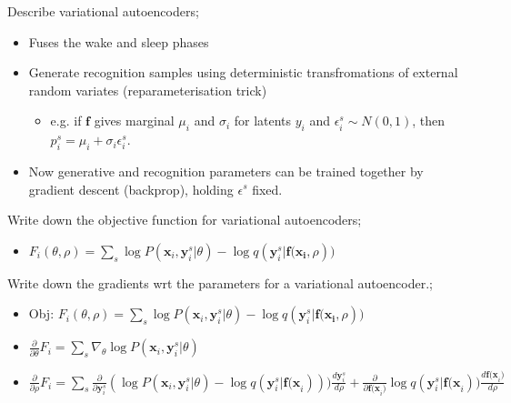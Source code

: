 \documentclass{article}
\begin{document}
Describe variational autoencoders; \begin{itemize}
    \item Fuses the wake and sleep phases
    \item Generate recognition samples using deterministic transfromations of external random variates (reparameterisation trick) \begin{itemize}
        \item e.g. if $\bm{f}$ gives marginal $\mu_i$ and $\sigma_i$ for latents $y_i$ and $\epsilon^s_i \sim N(0,1)$, then $p^s_i = \mu_i + \sigma_i\epsilon_i^s$.
    \end{itemize}
    \item Now generative and recognition parameters can be trained together by gradient descent (backprop), holding $\epsilon^s$ fixed.
\end{itemize}

Write down the objective function for variational autoencoders; \begin{itemize}
    \item $F_i(\theta, \rho) = \sum_s \log P(\bm{x}_i, \bm{y}_i^s|\theta) - \log q(\bm{y}_i^s|\bm{f(x_i}, \rho))$
\end{itemize}

Write down the gradients wrt the parameters for a variational autoencoder.;\begin{itemize}
    \item Obj: $F_i(\theta, \rho) = \sum_s \log P(\bm{x}_i, \bm{y}_i^s|\theta) - \log q(\bm{y}_i^s|\bm{f(x_i}, \rho))$
    \item $\frac{\partial}{\partial \theta}F_i = \sum_s \nabla_\theta \log P(\bm{x}_i, \bm{y}^s_i|\theta)$
    \item $\frac{\partial}{\partial\rho}F_i = \sum_s \frac{\partial}{\partial \bm{y}^s_i}(\log P(\bm{x}_i, \bm{y}_i^s|\theta) - \log q(\bm{y}^s_i|\bm{f(x}_i)))\frac{d\bm{y}^s_i}{d\rho} + \frac{\partial}{\partial \bm{f(x}_i)}\log q(\bm{y}_i^s|\bm{f(x}_i))\frac{d\bm{f(x}_i)}{d\rho}$
\end{itemize}
\end{document}
